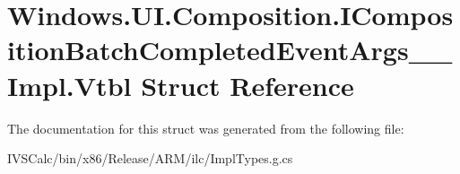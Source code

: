 \hypertarget{struct_windows_1_1_u_i_1_1_composition_1_1_i_composition_batch_completed_event_args_____impl_1_1_vtbl}{}\section{Windows.\+U\+I.\+Composition.\+I\+Composition\+Batch\+Completed\+Event\+Args\+\_\+\+\_\+\+Impl.\+Vtbl Struct Reference}
\label{struct_windows_1_1_u_i_1_1_composition_1_1_i_composition_batch_completed_event_args_____impl_1_1_vtbl}


The documentation for this struct was generated from the following file\+:\begin{DoxyCompactItemize}
\item 
I\+V\+S\+Calc/bin/x86/\+Release/\+A\+R\+M/ilc/Impl\+Types.\+g.\+cs\end{DoxyCompactItemize}
